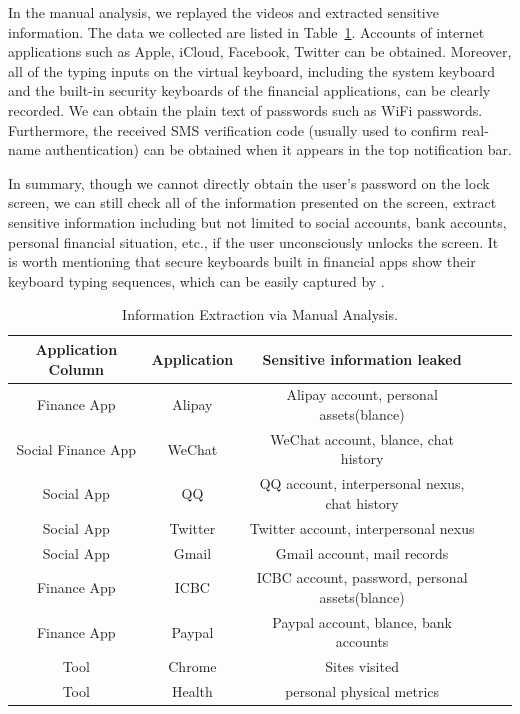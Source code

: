In the manual analysis, we replayed the videos and extracted sensitive information.
The data we collected are listed in Table~\ref{table:information_extracted}.
Accounts of internet applications such as Apple, iCloud, Facebook, Twitter can be obtained.
Moreover, all of the typing inputs on the virtual keyboard, including the system keyboard and the built-in security keyboards of the financial applications, can be clearly recorded.
We can obtain the plain text of passwords such as WiFi passwords.
Furthermore, the received SMS verification code (usually used to confirm real-name authentication) can be obtained when it appears in the top notification bar.

In summary, though we cannot directly obtain the user's password on the lock screen, we can still check all of the information presented on the screen, extract sensitive information including but not limited to social accounts, bank accounts, personal financial situation, etc., if the user unconsciously unlocks the screen.
It is worth mentioning that {secure keyboards} built in financial apps show their keyboard typing sequences, which can be easily captured by \tool.

\begin{table}[t]
	\centering
	\begin{tabular}{|c|c|c|c|c|}
		\hline
		\textbf{Application Column}  & \textbf{Application} & \textbf{Sensitive information leaked}                      \\
		\hline
		Finance App         & Alipay      & Alipay account, personal assets(blance)          \\
		\hline
		Social  Finance App & WeChat      & WeChat account, blance, chat history             \\
		\hline
		Social App          & QQ          & QQ account, interpersonal nexus, chat history    \\
		\hline
		Social App          & Twitter     & Twitter account, interpersonal nexus             \\
		\hline
		Social App          & Gmail       & Gmail account, mail records                      \\
		\hline
		Finance App         & ICBC        & ICBC account, password, personal assets(blance)  \\
		\hline
		Finance App         & Paypal      & Paypal account, blance, bank accounts            \\
		\hline
		Tool                & Chrome      & Sites visited                                    \\
		\hline
		Tool                & Health      & personal physical metrics      					 \\
		\hline
	\end{tabular}
	\linebreak
	\caption{Information Extraction via Manual Analysis.}
	\label{table:information_extracted}
\end{table}

